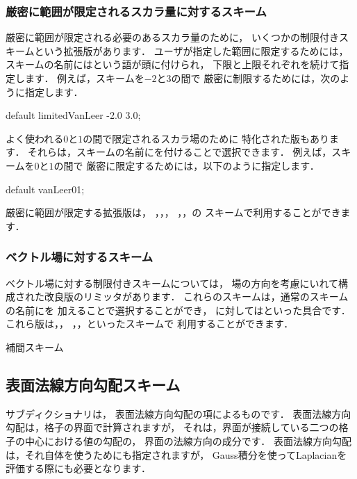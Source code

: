 \subsubsection{厳密に範囲が限定されるスカラ量に対するスキーム}
\label{sssec:4.4.1.1}
厳密に範囲が限定される必要のあるスカラ量のために，
いくつかの制限付きスキームという拡張版があります．
ユーザが指定した範囲に限定するためには，
スキームの名前にはという語が頭に付けられ，
下限と上限それぞれを続けて指定します．
例えば，スキームを$-2$と$3$の間で
厳密に制限するためには，次のように指定します．
\begin{OFverbatim}[file]
default limitedVanLeer -2.0 3.0;
\end{OFverbatim}
よく使われる$0$と$1$の間で限定されるスカラ場のために
特化された版もあります．
それらは，スキームの名前にを付けることで選択できます．
例えば，スキームを$0$と$1$の間で
厳密に限定するためには，以下のように指定します．
\begin{OFverbatim}[file]
default vanLeer01;
\end{OFverbatim}
厳密に範囲が限定する拡張版は，
，，，
，，の
スキームで利用することができます．

\subsubsection{ベクトル場に対するスキーム}
\label{sssec:4.4.1.2}
ベクトル場に対する制限付きスキームについては，
場の方向を考慮にいれて構成された改良版のリミッタがあります．
これらのスキームは，通常のスキームの名前にを
加えることで選択することができ，
に対してはといった具合です．
これら版は，，
，，といったスキームで
利用することができます．


\begin{table}[ht]
 
 \caption{補間スキーム}
 \label{tbl:4.6}
\end{table}


\subsection{表面法線方向勾配スキーム}
\label{ssec:4.4.2}
サブディクショナリは，
表面法線方向勾配の項によるものです．
表面法線方向勾配は，格子の界面で計算されますが，
それは，界面が接続している二つの格子の中心における値の勾配の，
界面の法線方向の成分です．
表面法線方向勾配は，それ自体を使うためにも指定されますが，
Gauss積分を使ってLaplacianを評価する際にも必要となります．

